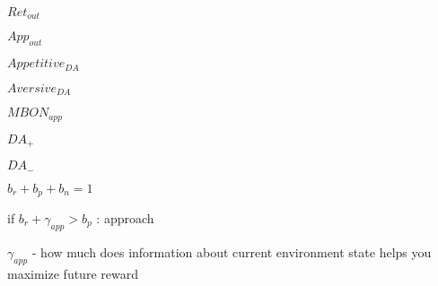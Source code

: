 $Ret_{out}$

$App_{out}$

$Appetitive_{DA}$

$Aversive_{DA}$

$MBON_{app}$

$DA_{+}$

$DA_{-}$

$b_{r} + b_{p} + b_{n} = 1$

if $b_{r} + \gamma_{app} > b_{p}$ : approach

$\gamma_{app}$ - how much does information about current environment state helps you maximize future reward